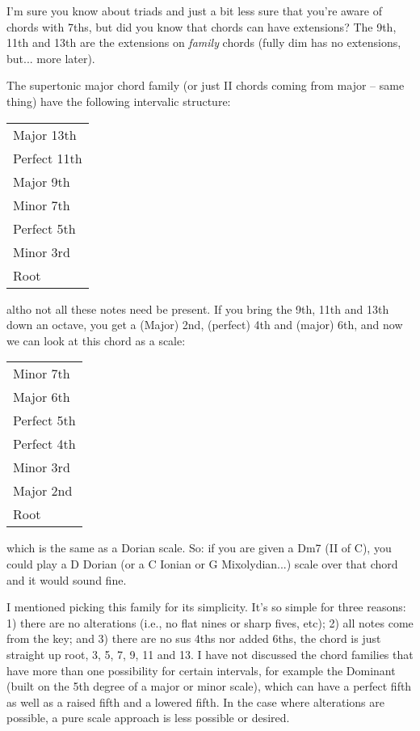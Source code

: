 I'm sure you know about triads and just a bit less sure that you're aware of
chords with 7ths, but did you know that chords can have extensions? The 9th,
11th and 13th are the extensions on \emph{family} chords (fully dim has no
extensions, but... more later).

The supertonic major chord family (or just II chords coming from major -- same
thing) have the following intervalic structure:

\begin{center}
\begin{tabular}{ | l | }
	\hline
  Major 13th\\
  Perfect 11th\\
  Major 9th\\
  Minor 7th\\
  Perfect 5th\\
  Minor 3rd\\
	\hline
  Root\\
  \hline
\end{tabular}
\end{center}%

altho not all these notes need be present. If you bring the 9th, 11th and 13th
down an octave, you get a (Major) 2nd, (perfect) 4th and (major) 6th, and now
we can look at this chord as a scale:

\begin{center}
\begin{tabular}{ | l | }
	\hline
  Minor 7th\\
  Major 6th\\
  Perfect 5th\\
  Perfect 4th\\
  Minor 3rd\\
  Major 2nd\\
	\hline
  Root\\
  \hline
\end{tabular}
\end{center}%


which is the same as a Dorian scale. So: if you are given a Dm7 (II of C),
you could play a D Dorian (or a C Ionian or G Mixolydian...) scale over that
chord and it would sound fine.

I mentioned picking this family for its simplicity. It's so simple for three
reasons: 1) there are no alterations (i.e., no flat nines or sharp fives, etc);
2) all notes come from the key; and 3) there are no sus 4ths nor added 6ths,
the chord is just straight up root, 3, 5, 7, 9, 11 and 13. I have not discussed
the chord families that have more than one possibility for certain intervals,
for example the Dominant (built on the 5th degree of a major or minor scale),
which can have a perfect fifth as well as a raised fifth and a lowered fifth.
In the case where alterations are possible, a pure scale approach is less
possible or desired.

